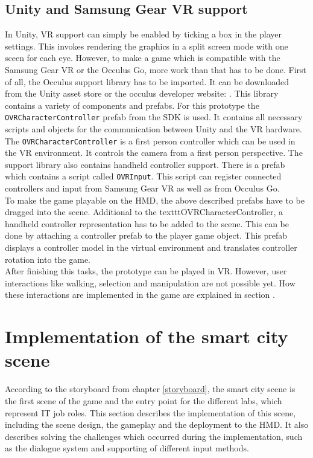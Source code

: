 \subsection{Unity and Samsung Gear VR support} \label{gearvrsupport}
In Unity, VR support can simply be enabled by ticking a box in the player settings. This invokes rendering the graphics in a split screen mode with one sceen for each eye. However, to make a game which is compatible with the Samsung Gear VR or the Occulus Go, more work than that has to be done. First of all, the Occulus support library has to be imported. It can be downloaded from the Unity asset store or the occulus developer website: \cite{Occulus.2018}. This library contains a variety of components and prefabs. For this prototype the \texttt{OVRCharacterController} prefab from the SDK is used. It contains all necessary scripts and objects for the communication between Unity and the VR hardware. The \texttt{OVRCharacterController} is a first person controller which can be used in the VR environment. It controls the camera from a first person perspective. The support library also contains handheld controller support. There is a prefab which contains a script called \texttt{OVRInput}. This script can register connected controllers and input from Samsung Gear VR as well as from Occulus Go.\\
To make the game playable on the HMD, the above described prefabs have to be dragged into the scene. Additional to the  texttt{OVRCharacterController}, a handheld controller representation has to be added to the scene. This can be done by attaching a controller prefab to the player game object. This prefab displays a controller model in the virtual environment and translates controller rotation into the game.\\ After finishing this tasks, the prototype can be played in VR. However, user interactions like walking, selection and manipulation are not possible yet. How these interactions are implemented in the game are explained in section \label{inputmethods}.

\section{Implementation of the smart city scene}
According to the storyboard from chapter \ref{storyboard}, the smart city scene is the first scene of the game and the entry point for the different labs, which represent IT job roles. This section describes the implementation of this scene, including the scene design, the gameplay and the deployment to the HMD. It also describes solving the challenges which occurred during the implementation, such as the dialogue system and supporting of different input methods.
